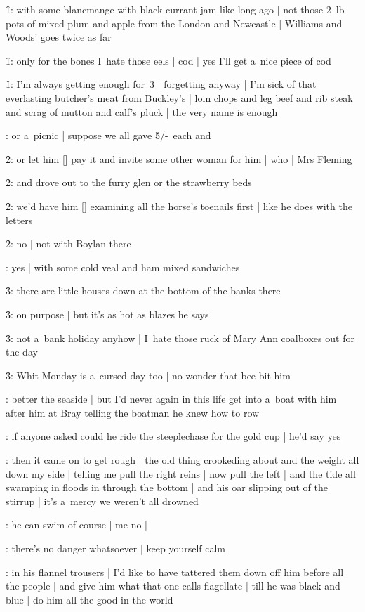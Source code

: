 \f1:
with some blancmange with black currant jam like long ago |
not those 2~lb pots of mixed plum and apple from the London and Newcastle |
Williams and Woods' goes twice as far

\f1:
only for the bones I~hate those eels |
cod |
yes I'll get a~nice piece of cod

\f1:
I'm always getting enough for~3 |
forgetting anyway |
I'm sick of that everlasting butcher's meat from Buckley's |
loin chops and leg beef and rib steak and scrag of mutton and calf's pluck |
the very name is enough

:
or a~picnic |
suppose we all gave 5/-~each and

\f2:
or let him [\boylan] pay it and invite some other woman for him |
who |
Mrs Fleming

\f2:
and drove out to the furry glen or the strawberry beds

\f2:
we'd have him [\bloom] examining all the horse's toenails first |
like he does with the letters

\f2:
no |
not with Boylan there

:
yes |
with some cold veal and ham mixed sandwiches

\f3:
there are little houses down at the bottom of the banks there

\f3:
on purpose |
but it's as hot as blazes he says

\f3:
not a~bank holiday anyhow |
I~hate those ruck of Mary Ann coalboxes out for the day

\f3:
Whit Monday is a~cursed day too |
no wonder that bee bit him

:
better the seaside |
but I'd never again in this life get into a~boat with him
after him at Bray telling the boatman he knew how to row

:
if anyone asked could he ride the steeplechase for the gold cup |
he'd say yes

:
then it came on to get rough |
the old thing crookeding about and the weight all down my side |
telling me pull the right reins |
now pull the left |
and the tide all swamping in floods in through the bottom |
and his oar slipping out of the stirrup |
it's a~mercy we weren't all drowned

:
he can swim of course |
me no |

:
there's no danger whatsoever |
keep yourself calm

:
in his flannel trousers |
I'd like to have tattered them down off him
before all the people |
and give him what that one calls flagellate |
till he was black and blue |
do him all the good in the world


